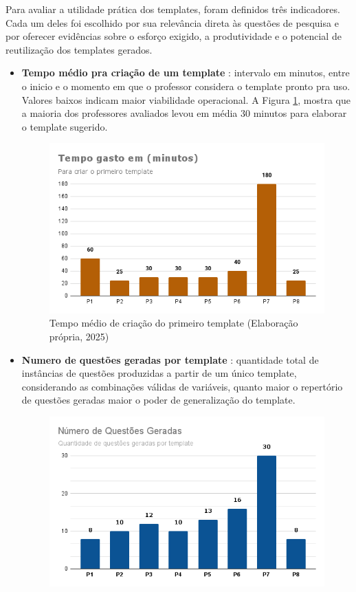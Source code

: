 Para avaliar a utilidade prática dos templates, foram definidos três indicadores. Cada um deles foi escolhido por sua relevância direta às questões de pesquisa e por oferecer evidências sobre o esforço exigido, a produtividade e o potencial de reutilização dos templates gerados.
    \begin{itemize}
        \item \textbf{Tempo médio pra criação de um template} : intervalo em minutos, entre o inicio e o momento em que o professor considera o template pronto pra uso. Valores baixos indicam maior viabilidade operacional. A Figura \ref{fig:tempo-gasto}, mostra que a maioria dos professores avaliados levou em média 30 minutos para elaborar o template sugerido.
\begin{figure}[ht]
	\centering
	\includegraphics[width=14cm]{./imagens/capitulo8/tempo-gasto}
	\caption{Tempo médio de criação do primeiro template (Elaboração própria, 2025) }
	\label{fig:tempo-gasto}
\end{figure}
        \item \textbf{Numero de questões geradas por template} : quantidade total de instâncias de questões produzidas a partir de um único template, considerando as combinações válidas de variáveis, quanto maior o repertório de questões geradas maior o poder de generalização do template.
\begin{figure}[ht]
	\centering
	\includegraphics[width=14cm]{./imagens/capitulo8/questoes-geradas}

\end{figure}
\end{itemize}
